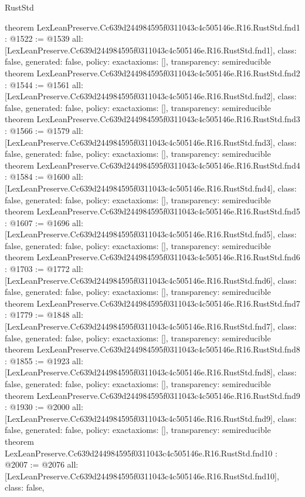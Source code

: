 \begin{lexlean}{RustStd}
\begin{coremodule}
{}
theorem LexLeanPreserve.Cc639d244984595f0311043c4c505146e.R16.RustStd.fnd1 : @1522 := @1539 {
  all: [LexLeanPreserve.Cc639d244984595f0311043c4c505146e.R16.RustStd.fnd1],
  class: false,
  generated: false,
  policy: exact{axioms: []},
  transparency: semireducible
}
theorem LexLeanPreserve.Cc639d244984595f0311043c4c505146e.R16.RustStd.fnd2 : @1544 := @1561 {
  all: [LexLeanPreserve.Cc639d244984595f0311043c4c505146e.R16.RustStd.fnd2],
  class: false,
  generated: false,
  policy: exact{axioms: []},
  transparency: semireducible
}
theorem LexLeanPreserve.Cc639d244984595f0311043c4c505146e.R16.RustStd.fnd3 : @1566 := @1579 {
  all: [LexLeanPreserve.Cc639d244984595f0311043c4c505146e.R16.RustStd.fnd3],
  class: false,
  generated: false,
  policy: exact{axioms: []},
  transparency: semireducible
}
theorem LexLeanPreserve.Cc639d244984595f0311043c4c505146e.R16.RustStd.fnd4 : @1584 := @1600 {
  all: [LexLeanPreserve.Cc639d244984595f0311043c4c505146e.R16.RustStd.fnd4],
  class: false,
  generated: false,
  policy: exact{axioms: []},
  transparency: semireducible
}
theorem LexLeanPreserve.Cc639d244984595f0311043c4c505146e.R16.RustStd.fnd5 : @1607 := @1696 {
  all: [LexLeanPreserve.Cc639d244984595f0311043c4c505146e.R16.RustStd.fnd5],
  class: false,
  generated: false,
  policy: exact{axioms: []},
  transparency: semireducible
}
theorem LexLeanPreserve.Cc639d244984595f0311043c4c505146e.R16.RustStd.fnd6 : @1703 := @1772 {
  all: [LexLeanPreserve.Cc639d244984595f0311043c4c505146e.R16.RustStd.fnd6],
  class: false,
  generated: false,
  policy: exact{axioms: []},
  transparency: semireducible
}
theorem LexLeanPreserve.Cc639d244984595f0311043c4c505146e.R16.RustStd.fnd7 : @1779 := @1848 {
  all: [LexLeanPreserve.Cc639d244984595f0311043c4c505146e.R16.RustStd.fnd7],
  class: false,
  generated: false,
  policy: exact{axioms: []},
  transparency: semireducible
}
theorem LexLeanPreserve.Cc639d244984595f0311043c4c505146e.R16.RustStd.fnd8 : @1855 := @1923 {
  all: [LexLeanPreserve.Cc639d244984595f0311043c4c505146e.R16.RustStd.fnd8],
  class: false,
  generated: false,
  policy: exact{axioms: []},
  transparency: semireducible
}
theorem LexLeanPreserve.Cc639d244984595f0311043c4c505146e.R16.RustStd.fnd9 : @1930 := @2000 {
  all: [LexLeanPreserve.Cc639d244984595f0311043c4c505146e.R16.RustStd.fnd9],
  class: false,
  generated: false,
  policy: exact{axioms: []},
  transparency: semireducible
}
theorem LexLeanPreserve.Cc639d244984595f0311043c4c505146e.R16.RustStd.fnd10 : @2007 := @2076 {
  all: [LexLeanPreserve.Cc639d244984595f0311043c4c505146e.R16.RustStd.fnd10],
  class: false,
}
\end{coremodule}
\end{lexlean}
